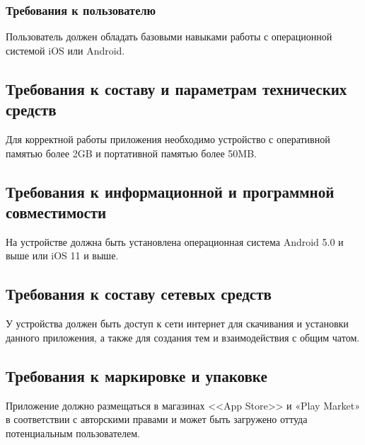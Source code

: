 \subsubsection{Требования к пользователю}

Пользователь должен обладать базовыми навыками работы с операционной системой iOS или Android.

\subsection{Требования к составу и параметрам технических средств}

Для корректной работы приложения необходимо устройство с оперативной памятью более 2GB и портативной памятью более 50MB.

\subsection{Требования к информационной и программной совместимости}

На устройстве должна быть установлена операционная система Android 5.0 и выше или iOS 11 и выше.

\subsection{Требования к составу сетевых средств}

У устройства должен быть доступ к сети интернет для скачивания и установки данного приложения, а также для создания тем и взаимодействия с общим чатом.

\subsection{Требования к маркировке и упаковке}

Приложение должно размещаться в магазинах <<App Store>> и «Play Market» в соответствии с авторскими правами и может быть загружено оттуда потенциальным пользователем.